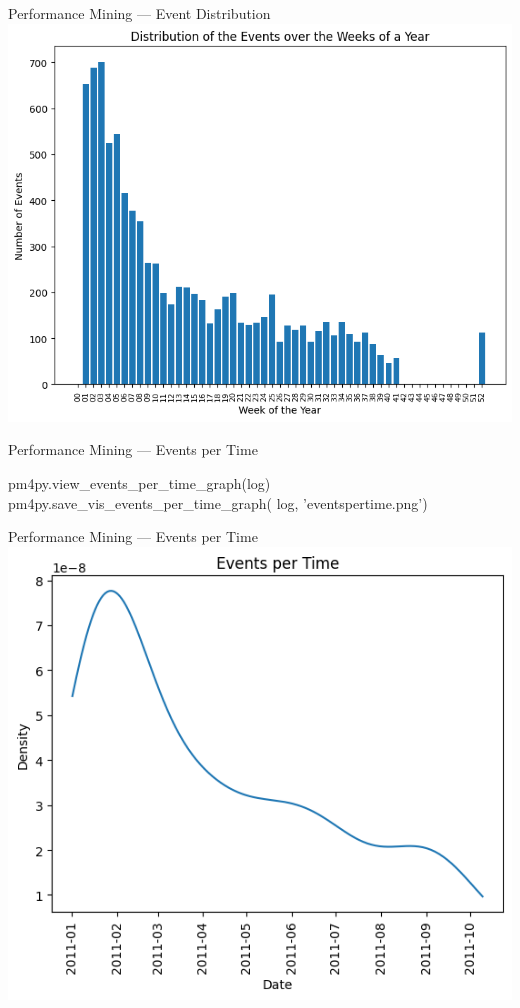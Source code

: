\documentclass[ignorenonframetext,xcolor=x11names]{beamer}
\begin{document}
\begin{frame}{Performance Mining --- Event Distribution}
\centering
\includegraphics[width=.8\textwidth]{eventsdistribution.png}
\end{frame}

\begin{frame}[fragile]{Performance Mining --- Events per Time}
\footnotesize
\begin{pythoncode}
pm4py.view_events_per_time_graph(log)
pm4py.save_vis_events_per_time_graph(
    log, 'eventspertime.png')
\end{pythoncode}
\end{frame}

\begin{frame}{Performance Mining --- Events per Time}
\centering
\includegraphics[width=.8\textwidth]{eventspertime.png}
\end{frame}
\end{document}
